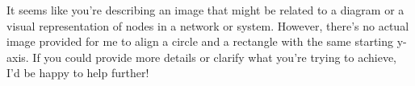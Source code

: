 It seems like you're describing an image that might be related to a diagram or a visual representation of nodes in a network or system. However, there's no actual image provided for me to align a circle and a rectangle with the same starting y-axis. If you could provide more details or clarify what you're trying to achieve, I'd be happy to help further!